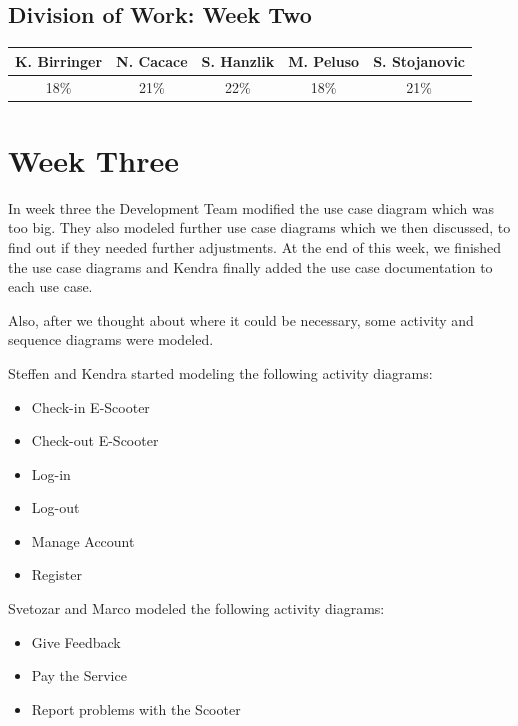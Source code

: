 \documentclass[a4paper, 12pt]{article}
\begin{document}
\subsection{Division of Work: Week Two}
\begin{table}[htbp]
\centering
\setlength{\tabcolsep}{10pt}
\begin{tabular}{|c|c|c|c|c|}
\hline
K. Birringer & N. Cacace & S. Hanzlik & M. Peluso & S. Stojanovic\\
\hline
18\%   &21\%  &22\%  &18\%  &21\%\\
\hline
\end{tabular}
\end{table}

\section{Week Three}
In week three the Development Team modified the use case diagram which was too big. They also modeled further use case diagrams which we then discussed, to find out if they needed further adjustments. At the end of this week, we finished the use case diagrams and Kendra finally added the use case documentation to each use case.

Also, after we thought about where it could be necessary, some activity and sequence diagrams were modeled.

Steffen and Kendra started modeling the following activity diagrams: 
\begin{itemize}
    \item Check-in E-Scooter
    \item Check-out E-Scooter
    \item Log-in
    \item Log-out
    \item Manage Account
    \item Register
\end{itemize}


Svetozar and Marco modeled the following activity diagrams:
\begin{itemize}
    \item Give Feedback
    \item Pay the Service
    \item Report problems with the Scooter
\end{itemize}
\end{document}
